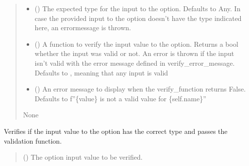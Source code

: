 \documentclass[a4paper,10pt,english]{sphinxmanual}
\begin{document}
\begin{fulllineitems}
\begin{fulllineitems}
\begin{quote}
\begin{description}
\begin{itemize}
\item {}
\sphinxAtStartPar
{} () \textendash{} The expected type for the input to the option. Defaults to Any. In case the provided
input to the option doesn’t have the type indicated here, an error\sphinxhyphen{}message is thrown.

\item {}
\sphinxAtStartPar
{} (\sphinxstyleliteralemphasis{\sphinxupquote{{[}}}\sphinxstyleliteralemphasis{\sphinxupquote{{[}}}\sphinxstyleliteralemphasis{\sphinxupquote{{]}}}\sphinxstyleliteralemphasis{\sphinxupquote{, }}\sphinxstyleliteralemphasis{\sphinxupquote{{]}}}) \textendash{} A function to verify the input value to the option. Returns a bool
whether the input was valid or not. An error is thrown if the input isn’t valid with the error message
defined in verify\_error\_message. Defaults to , meaning that any input is valid

\item {}
\sphinxAtStartPar
{} (\sphinxstyleliteralemphasis{\sphinxupquote{{[}}}\sphinxstyleliteralemphasis{\sphinxupquote{{]}}}) \textendash{} An error message to display when the verify\_function returns False.
Defaults to f”\{value\} is not a valid value for \{self.name\}”

\end{itemize}

\sphinxAtStartPar
None

\end{description}\end{quote}

\end{fulllineitems}


\begin{fulllineitems}
\label{\detokenize{fagus.utils:fagus.utils.FagusOption.verify}}
\pysigstartsignatures
{}
\pysigstopsignatures
\sphinxAtStartPar
Verifies if the input value to the option has the correct type and passes the validation function.
\begin{quote}\begin{description}
\sphinxAtStartPar
{} () \textendash{} The option input value to be verified.


\end{description}
\end{quote}
\end{fulllineitems}
\end{fulllineitems}
\end{document}
